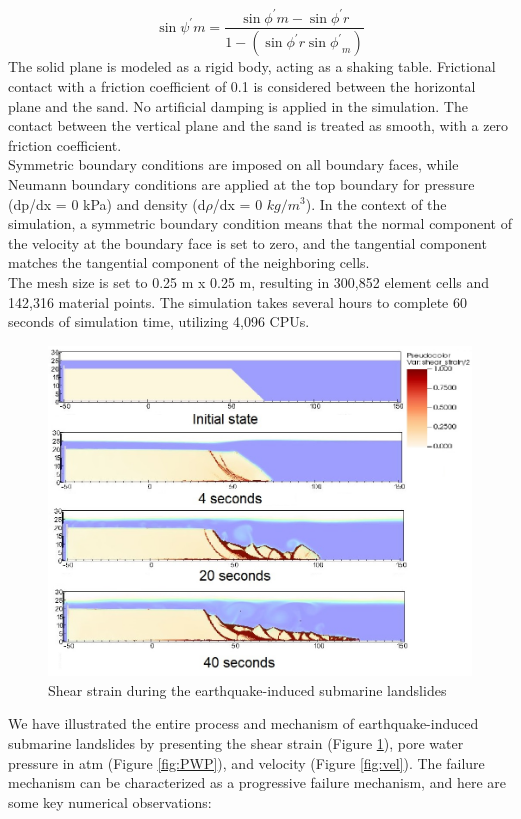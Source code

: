 \documentclass[preprint,12pt]{elsarticle}
\begin{document}
\begin{equation}
\sin{\psi^\prime}m = \frac{\sin{\phi^\prime}m - \sin{\phi^\prime}{r}}{1 - (\sin{\phi^\prime}{r}\sin{\phi^\prime}_m)}
\end{equation}
The solid plane is modeled as a rigid body, acting as a shaking table. Frictional contact with a friction coefficient of 0.1 is considered between the horizontal plane and the sand. No artificial damping is applied in the simulation. The contact between the vertical plane and the sand is treated as smooth, with a zero friction coefficient.\\
Symmetric boundary conditions are imposed on all boundary faces, while Neumann boundary conditions are applied at the top boundary for pressure (dp/dx = 0 kPa) and density (d$\rho$/dx = 0 $kg/m^3$). In the context of the simulation, a symmetric boundary condition means that the normal component of the velocity at the boundary face is set to zero, and the tangential component matches the tangential component of the neighboring cells.\\
The mesh size is set to 0.25 m x 0.25 m, resulting in 300,852 element cells and 142,316 material points. The simulation takes several hours to complete 60 seconds of simulation time, utilizing 4,096 CPUs.
%
\begin{figure}[H]
\center
\includegraphics[scale=0.5]{landslide_gamma.jpeg}
\caption{Shear strain during the earthquake-induced submarine landslides}
\label{fig:gamma}
\end {figure}
%
%
We have illustrated the entire process and mechanism of earthquake-induced submarine landslides by presenting the shear strain (Figure \ref{fig:gamma}), pore water pressure in atm (Figure \ref{fig:PWP}), and velocity (Figure \ref{fig:vel}). The failure mechanism can be characterized as a progressive failure mechanism, and here are some key numerical observations:
\end{document}
